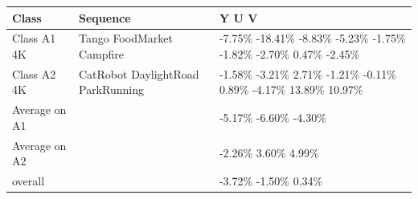 \begin{tabular}{lll}
\toprule
Class & Sequence & Y U V \\
\midrule
Class A1 4K & Tango FoodMarket Campfire & -7.75\% -18.41\% -8.83\% -5.23\% -1.75\% -1.82\% -2.70\% 0.47\% -2.45\% \\
Class A2 4K & CatRobot DaylightRoad ParkRunning & -1.58\% -3.21\% 2.71\% -1.21\% -0.11\% 0.89\% -4.17\% 13.89\% 10.97\% \\
Average on A1 &  & -5.17\% -6.60\% -4.30\% \\
Average on A2 &  & -2.26\% 3.60\% 4.99\% \\
overall &  & -3.72\% -1.50\% 0.34\% \\
\bottomrule
\end{tabular}
